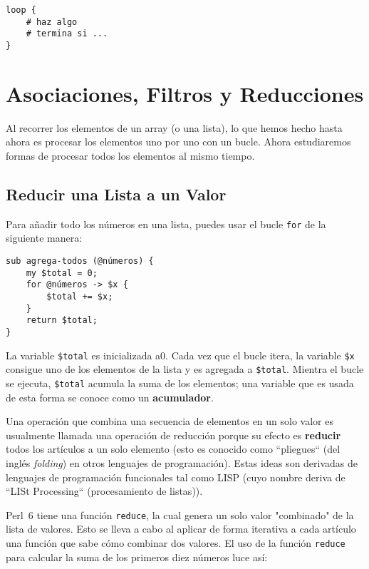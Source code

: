 \begin{verbatim}
loop {
    # haz algo
    # termina si ...
}
\end{verbatim}
%


\section{Asociaciones, Filtros y Reducciones}
\label{map_filter}

Al recorrer los elementos de un array (o una lista), lo que hemos
hecho hasta ahora es procesar los elementos uno por uno con un 
bucle. Ahora estudiaremos formas de procesar todos los elementos
al mismo tiempo.

\subsection{Reducir una Lista a un Valor}

Para añadir todo los números en una lista, puedes usar 
el bucle {\tt for} de la siguiente manera:

\begin{verbatim}
sub agrega-todos (@números) {
    my $total = 0;
    for @números -> $x {
        $total += $x;
    }
    return $total;
}
\end{verbatim}
%
La variable {\tt \$total} es inicializada a0. Cada vez que el
bucle itera, la variable {\tt \$x} consigue uno de los elementos
de la lista y es agregada a {\tt \$total}. Mientra el bucle se ejecuta,
{\tt \$total} acumula la suma de los elementos; una variable que 
es usada de esta forma se conoce como un {\bf acumulador}.

Una operación que combina una secuencia de elementos en un
solo valor es usualmente llamada una operación de reducción porque
su efecto es {\bf reducir} todos los artículos a un solo elemento
(esto es conocido como ``pliegues`` (del inglés \emph{folding})
en otros lenguajes de programación). Estas ideas son derivadas de
lenguajes de programación funcionales tal como LISP (cuyo nombre
deriva de ``LISt Processing`` (procesamiento de listas)).

Perl~6 tiene una función {\tt reduce}, la cual genera un solo
valor "combinado" de la lista de valores. Esto se lleva a cabo 
al aplicar de forma iterativa a cada artículo una
función que sabe cómo combinar dos valores. El uso de la función
{\tt reduce} para calcular la suma de los primeros 
diez números luce así:

